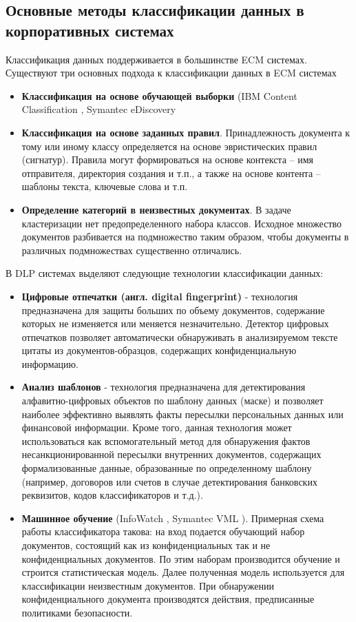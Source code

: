 \documentclass[russian, utf8, emptystyle]{eskdtext}
\begin{document}
\subsection{Основные методы классификации данных в корпоративных системах}
Классификация данных поддерживается в большинстве ECM системах. Существуют три основных подхода к классификации данных в ECM системах
\begin{itemize}
	\item {\bf Классификация на основе обучающей выборки} (IBM Content Classification \cite{ContentClassification}, Symantec eDiscovery \cite{Symantec}
	\item {\bf Классификация на основе заданных правил}. Принадлежность документа к тому или иному классу определяется на основе эвристических правил (сигнатур). Правила могут формироваться на основе контекста – имя отправителя, директория создания и т.п., а также на основе контента – шаблоны текста, ключевые слова и т.п. 
	\item {\bf Определение категорий в неизвестных документах}.
	В задаче кластеризации нет предопределенного набора классов. Исходное множество документов разбивается на подмножество таким образом, чтобы документы в различных подмножествах существенно отличались.
\end{itemize}
В DLP системах выделяют следующие технологии классификации данных:
\begin{itemize}
	\item {\bf Цифровые отпечатки (англ. digital fingerprint)} - технология предназначена для защиты больших по объему документов, содержание которых не изменяется или меняется незначительно. Детектор цифровых отпечатков позволяет автоматически обнаруживать в анализируемом тексте цитаты из документов-образцов, содержащих конфиденциальную информацию.
	\item {\bf Анализ шаблонов} - технология предназначена для детектирования алфавитно-цифровых объектов по шаблону данных (маске) и позволяет наиболее эффективно выявлять факты пересылки персональных данных или финансовой информации. Кроме того, данная технология может использоваться как вспомогательный метод для обнаружения фактов несанкционированной пересылки внутренних документов, содержащих формализованные данные, образованные по определенному шаблону (например, договоров или счетов в случае детектирования банковских реквизитов, кодов классификаторов и т.д.).
	\item {\bf Машинное обучение} (InfoWatch \cite{bkf}, Symantec VML \cite{MachLearn}). Примерная схема работы классификатора такова: на вход подается обучающий набор документов, состоящий как из конфиденциальных так и не конфиденциальных документов. По этим наборам производится обучение и строится статистическая модель. Далее полученная модель используется для классификации неизвестным документов. При обнаружении конфиденциального документа производятся действия, предписанные политиками безопасности.
\end{itemize}
\end{document}
